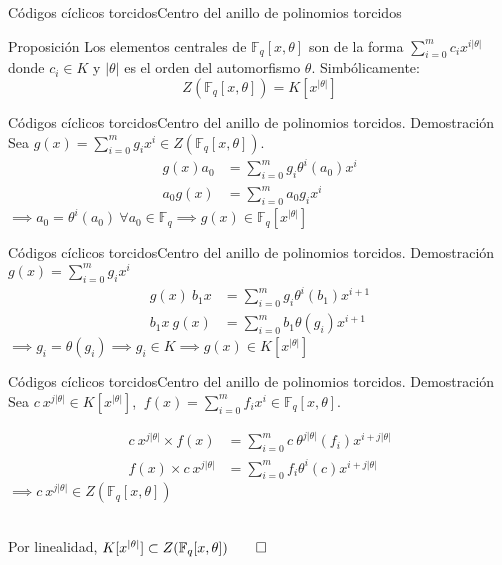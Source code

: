 \documentclass[aspectratio=43,14pt,spanish]{beamer}
\newcommand{\Fq}{\mathbb{F}_q}
\newcommand{\Fqxo}{\Fq[x, \theta]}
\theoremstyle{definition} %
\begin{document}
    \begin{frame}{Códigos cíclicos torcidos}{Centro del anillo de polinomios torcidos}
        \begin{alertblock}{Proposición}
            Los elementos centrales de $\Fqxo$ son de la forma
            $\sum_{i = 0}^{m}c_i x^{i |\theta|}$ donde $c_i \in K$ y $|\theta|$ es el orden del automorfismo $\theta$. Simbólicamente:
            $$
                Z(\Fqxo) = K[x^{|\theta|}]
            $$
        \end{alertblock}
    \end{frame}

    \begin{frame}{Códigos cíclicos torcidos}{Centro del anillo de polinomios torcidos. Demostración}
        Sea $g(x) = \sum_{i = 0}^{m}g_i x^i \in Z(\Fqxo)$.
        \begin{align*}
            g(x) a_0 &= \sum_{i = 0}^{m}g_i \theta^i(a_0) x^i \\
            a_0 g(x) &= \sum_{i = 0}^{m}a_0 g_i x^i
        \end{align*}
        $\implies a_0 = \theta^i(a_0)\ \forall a_0 \in \Fq \implies g(x) \in \Fq[x^{|\theta|}]$
    \end{frame}

    \begin{frame}{Códigos cíclicos torcidos}{Centro del anillo de polinomios torcidos. Demostración}
        $g(x) = \sum_{i = 0}^{m}g_i x^i$
        \begin{align*}
            g(x)\  b_1 x &= \sum_{i = 0}^{m}g_{i} \theta^{i}(b_1) x^{i+1} \\
            b_1 x \  g(x) &= \sum_{i = 0}^{m}b_1 \theta(g_{i}) x^{i+1}
        \end{align*}
        $\implies g_{i} = \theta(g_{i}) \implies g_i \in K \implies g(x) \in K[x^{|\theta|}]$
    \end{frame}

    \begin{frame}{Códigos cíclicos torcidos}{Centro del anillo de polinomios torcidos. Demostración}
        Sea $c\ x^{j|\theta|} \in K[x^{|\theta|}]$,
        $\ f(x) = \sum_{i = 0}^{m}f_i x^i \in \Fqxo$.

        \begin{align*}
            c\ x^{j|\theta|} \times f(x) &=
                \sum_{i = 0}^{m}c\ \theta^{j|\theta|}(f_{i}) x^{i+j|\theta|} \\
            f(x) \times c\ x^{j|\theta|} &=
                \sum_{i = 0}^{m}f_{i} \theta^{i}(c) x^{i+j|\theta|}
        \end{align*}
        $\implies c\ x^{j|\theta|} \in Z(\Fqxo)$

        \ \\

        Por linealidad, $K[x^{|\theta|}] \subset Z(\Fqxo) \qed$
    \end{frame}
\end{document}
